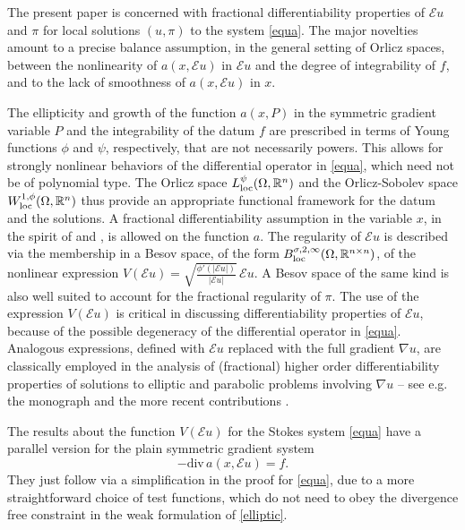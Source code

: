 \documentclass[leqno,11pt]{amsart}%
\numberwithin{equation}{section}
\newcommand{\dive}{\mathrm{div}\,}
\def\Rn{{\mathbb R}^{n}}
\def\E{\mathcal{E}}
\theoremstyle{definition}
\numberwithin{equation}{section}
\begin{document}
\par The present paper is concerned with fractional differentiability properties of $\E u$ and $\pi$ for local solutions $(u,\pi)$ to the system \eqref{equa}. 
The major novelties amount to a precise   balance assumption, in the general setting of Orlicz spaces, between the  nonlinearity of    $a(x, \E u)$ in $\E u$ and the degree of integrability of $f$, and to the lack of smoothness of $a(x, \E u)$ in $x$.


The ellipticity and growth of the function $a(x, P)$ in the symmetric gradient variable $P$ and the integrability of the datum $f$ are prescribed in terms of Young functions $\phi$ and $\psi$, respectively,   that are not necessarily powers. This allows for strongly nonlinear behaviors of the differential operator in \eqref{equa}, which need not be of polynomial type.
The Orlicz space $L^\psi_{\rm loc}(\Omega, \Rn)$ and the Orlicz-Sobolev space $W^{1,\phi}_{\rm loc}(\Omega, \Rn)$ thus provide an appropriate functional framework for the datum and the solutions.
A fractional differentiability assumption in the variable $x$, in the spirit of \cite{DevoreSharpley:1984} and \cite{Hajlasz}, is allowed on the function $a$. The regularity of $\E u$ is described via the membership in a  Besov space, of the form $B^{\sigma, 2, \infty}_{\rm loc}(\Omega, \mathbb R^{n\times n})$, of 
the  nonlinear expression  $V(\E u)= \sqrt{\frac{\phi'(|\E u|)}{|\E u|}}\,\E u$. A Besov space of the same kind is also well suited to account for the fractional regularity of $\pi$. 
 The use of the expression $V(\E u)$ is critical in discussing differentiability properties of $\E u$, because of the possible degeneracy of the differential operator in \eqref{equa}. Analogous expressions, defined with 
 $\E u$
 replaced with the full gradient $\nabla u$, are classically employed in
 the analysis of (fractional) higher order differentiability properties of solutions to elliptic and parabolic problems involving
 $\nabla u$ -- see e.g. the monograph \cite{Giusti}  and the more recent contributions   \cites{DDHSW, DieEtt08, GM,  GPdol, GPS0, MaPas, Ming, Pas}.

The results about the function $V(\E u)$ for the Stokes system \eqref{equa} have a parallel version for the  plain symmetric gradient system 
\begin{equation}\label{elliptic}
    -\dive a(x,\E u)= f.
\end{equation}
They just follow via a simplification in the proof for \eqref{equa}, due to a more straightforward choice of test functions, which do not need to obey the divergence free constraint in the weak formulation of \eqref{elliptic}.
 
\end{document}
